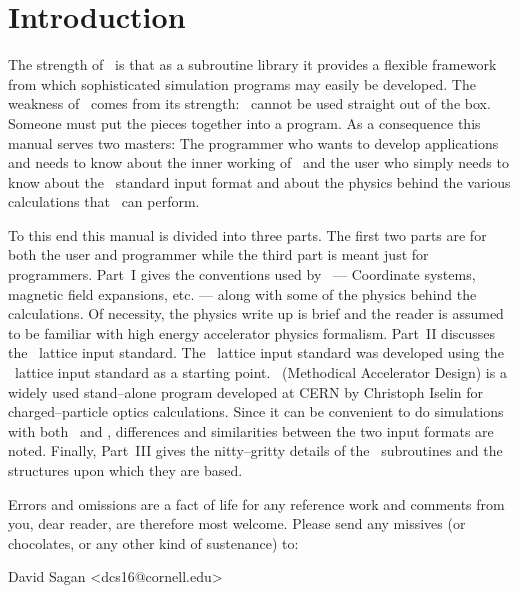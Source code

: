 \section*{Introduction}

The strength of \bmad\ is that as a subroutine library it provides a
flexible framework from which sophisticated simulation programs may
easily be developed.  The weakness of \bmad\ comes from its strength:
\bmad\ cannot be used straight out of the box. Someone must put the
pieces together into a program. As a consequence this manual serves
two masters: The programmer who wants to develop applications and
needs to know about the inner working of \bmad\ and the user who simply 
needs to know about
the \bmad\ standard input format and about the physics behind the various
calculations that \bmad\ can perform.

To this end this manual is divided into three parts. The first two
parts are for both the user and programmer while the third part is
meant just for programmers. Part~I gives the conventions used by
\bmad\ --- Coordinate systems, magnetic field expansions, etc. ---
along with some of the physics behind the calculations. Of necessity,
the physics write up is brief and the reader is assumed to be familiar
with high energy accelerator physics formalism. Part~II discusses the
\bmad\ lattice input standard.  The \bmad\ lattice input standard was
developed using the \mad\ lattice input standard as a starting
point. \mad\ (Methodical Accelerator Design) is a widely used
stand--alone program developed at CERN by Christoph Iselin for
charged--particle optics calculations. Since it can be convenient
to do simulations with both \mad\ and \bmad, differences and
similarities between the two input formats are noted. 
Finally, Part~III gives the nitty--gritty details of the \bmad\
subroutines and the structures upon which they are based.

Errors and omissions are a fact of life for any reference work and
comments from you, dear reader, are therefore most welcome. Please
send any missives (or chocolates, or any other kind of sustenance) to:
\begin{example}
  David Sagan <dcs16@cornell.edu>
\end{example}
